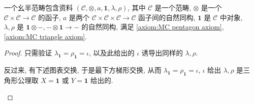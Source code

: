 \begin{definition}[幺半范畴]
    一个幺半范畴包含资料 \((\mathcal{C},\otimes,a,\mathbf{1},\lambda,\rho)\), 其中 \(\mathcal{C}\) 是一个范畴,
    \(\otimes\) 是一个 \(\mathcal{C} \times \mathcal{C} \to \mathcal{C}\) 的函子, \(a\) 是两个 \(\mathcal{C} \times \mathcal{C} \times \mathcal{C} \to \mathcal{C}\) 函子间的自然同构,
    \(\mathbf{1}\) 是 \(\mathcal{C}\) 中对象, \(\lambda,\rho\) 是 \(\mathbf{1} \otimes -, - \otimes \mathbf{1} \to -\) 的自然同构, 满足 \ref{axiom:MC pentagon axiom}, \ref{axiom:MC triangle axiom}.

    \begin{proof}
        只需验证 \(\lambda_\mathbf{1} = \rho_\mathbf{1} = \iota\), 以及此给出的 \(\iota\) 诱导出同样的 \(\lambda,\rho\).

        反过来, 有下述图表交换, 于是最下方梯形交换, 从而 \(\lambda_\mathbf{1} = \rho_\mathbf{1} = \iota\), 
        \(\iota\) 给出 \(\lambda,\rho\) 是三角形公理取 \(X = \mathbf{1}\) 或 \(Y = \mathbf{1}\) 给出的.

        \begin{center}
\end{center}
\end{proof}
\end{definition}
